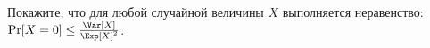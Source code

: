 Покажите, что для любой случайной величины $X$ выполняется неравенство:
$\Pr[X = 0] \le \frac{\Var[X]}{\Exp[X]^2}$.
